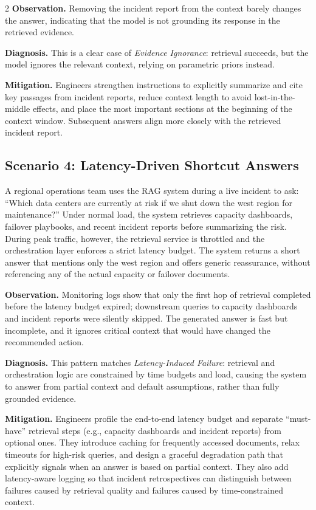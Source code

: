 \documentclass[11pt,a4paper]{article}
\begin{document}
\begin{multicols}{2}
\textbf{Observation.} Removing the incident report from the context barely changes the answer, indicating that the model is not grounding its response in the retrieved evidence.

\textbf{Diagnosis.} This is a clear case of \textit{Evidence Ignorance}: retrieval succeeds, but the model ignores the relevant context, relying on parametric priors instead.

\textbf{Mitigation.} Engineers strengthen instructions to explicitly summarize and cite key passages from incident reports, reduce context length to avoid lost-in-the-middle effects, and place the most important sections at the beginning of the context window. Subsequent answers align more closely with the retrieved incident report.

\subsection{Scenario 4: Latency-Driven Shortcut Answers}

A regional operations team uses the RAG system during a live incident to ask: ``Which data centers are currently at risk if we shut down the west region for maintenance?'' Under normal load, the system retrieves capacity dashboards, failover playbooks, and recent incident reports before summarizing the risk. During peak traffic, however, the retrieval service is throttled and the orchestration layer enforces a strict latency budget. The system returns a short answer that mentions only the west region and offers generic reassurance, without referencing any of the actual capacity or failover documents.

\textbf{Observation.} Monitoring logs show that only the first hop of retrieval completed before the latency budget expired; downstream queries to capacity dashboards and incident reports were silently skipped. The generated answer is fast but incomplete, and it ignores critical context that would have changed the recommended action.

\textbf{Diagnosis.} This pattern matches \textit{Latency-Induced Failure}: retrieval and orchestration logic are constrained by time budgets and load, causing the system to answer from partial context and default assumptions, rather than fully grounded evidence.

\textbf{Mitigation.} Engineers profile the end-to-end latency budget and separate ``must-have'' retrieval steps (e.g., capacity dashboards and incident reports) from optional ones. They introduce caching for frequently accessed documents, relax timeouts for high-risk queries, and design a graceful degradation path that explicitly signals when an answer is based on partial context. They also add latency-aware logging so that incident retrospectives can distinguish between failures caused by retrieval quality and failures caused by time-constrained context.


\end{multicols}
\end{document}
